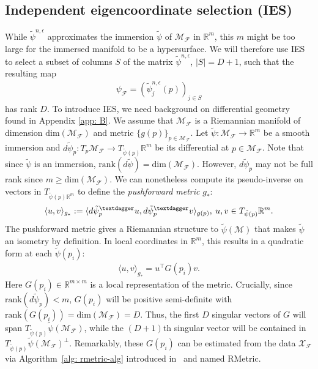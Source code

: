\documentclass[reqno, 12pt]{article}
\begin{document}
\subsection{Independent eigencoordinate selection (IES)}

While $\tilde{\psi}^{n,\epsilon}$ approximates the immersion $\tilde{\psi}$ of $\mathcal{M}_{\mathcal{F}}$ in $\mathbb{R}^{m}$, this $m$ might be too large for the immersed manifold to be a hypersurface. We will therefore use IES \parencite{chen2019selecting} to select a subset of columns $S$ of the matrix $\tilde {\psi}^{n,\epsilon}$, $|S| = D+1$, such that the resulting map 
\begin{align}
    \psi_{\mathcal{F}} = (\tilde{\psi}^{n,\epsilon}_j(p))_{j \in S}
\end{align}
has rank $D$. To introduce IES, we need background on differential geometry found in Appendix \ref{app: B}. We assume that $\mathcal{M}_{\mathcal{F}}$ is a Riemannian manifold of dimension $\text{dim}(\mathcal{M}_{\mathcal{F}})$ and metric $\{g(p)\}_{p \in \mathcal{M}_{\mathcal{F}}}$. Let $\tilde{\psi}: \mathcal{M}_{\mathcal{F}} \to \mathbb{R}^m$ be a smooth immersion and $d\tilde{\psi}_{p}: T_{p}\mathcal{M}_{\mathcal{F}} \to T_{\tilde{\psi}(p)}\mathbb{R}^{m}$ be its differential at $p \in \mathcal{M}_{\mathcal{F}}$. Note that since $\tilde{\psi}$ is an immersion, $\text{rank}(d\tilde{\psi}) = \text{dim}(\mathcal{M}_{\mathcal{F}})$. However, $d\tilde{\psi}_{p}$ may not be full rank since $m \geq \text{dim}(\mathcal{M}_{\mathcal{F}})$. We can nonetheless compute its pseudo-inverse on vectors in $T_{\tilde{\psi}(p)\mathbb{R}^{m}}$ to define the \emph{pushforward metric} $g_{*}$: 
\begin{align}
    \langle u,v \rangle_{g_{*}} := \langle d\tilde{\psi}_{p}^{\textdagger} u, d\tilde{\psi}_{p}^{\textdagger} v\rangle_{g(p)}, \: u,v \in T_{\tilde{\psi}(p)}\mathbb{R}^{m}. \label{eq: pseudometric}
\end{align}
The pushforward metric gives a Riemannian structure to $\tilde{\psi}(\mathcal{M})$ that makes $\tilde{\psi}$ an isometry by definition. In local coordinates in $\mathbb{R}^{m}$, this results in a quadratic form at each $\tilde{\psi}(p_i)$: 
\begin{align}
    \langle u,v \rangle_{g_{*}} = u^{\top}G(p_i)v. 
\end{align}
Here $G(p_i) \in \mathbb{R}^{m \times m}$ is a local representation of the metric. Crucially, since $\text{rank}(d\tilde{\psi}_p) < m$, $G(p_i)$ will be positive semi-definite with $\text{rank}(G(p_i)) = \text{dim}(\mathcal{M}_{\mathcal{F}}) = D$. Thus, the first $D$ singular vectors of $G$ will span $T_{\tilde{\psi}(p)}\tilde{\psi}(\mathcal{M}_{\mathcal{F}})$, while the $(D+1)$th singular vector will be contained in $T_{\tilde{\psi}(p)}\tilde{\psi}(\mathcal{M}_{\mathcal{F}})^{\perp}$. Remarkably, these $G(p_i)$ can be estimated from the data $\mathcal{X}_{\mathcal{F}}$ via Algorithm~\ref{alg: rmetric-alg} introduced in~ \cite{perraul2013non} and named RMetric. 
\end{document}
